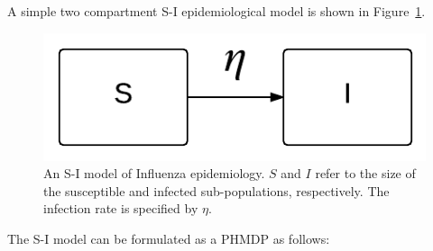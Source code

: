 A simple two compartment S-I epidemiological model is shown in Figure~\ref{fig:si_spec}.
\begin{figure}[h!]
    \centering
    \includegraphics[width=0.3\linewidth, height=0.11\linewidth]{images/si}
    \caption{An S-I model of Influenza epidemiology. {\footnotesize $ S $} and {\footnotesize $ I $} refer to the size of the susceptible and infected sub-populations, respectively. The infection rate is specified by {\footnotesize $ \eta$}. }
    \label{fig:si_spec}            
\end{figure}
The S-I model can be formulated as a PHMDP as follows:
